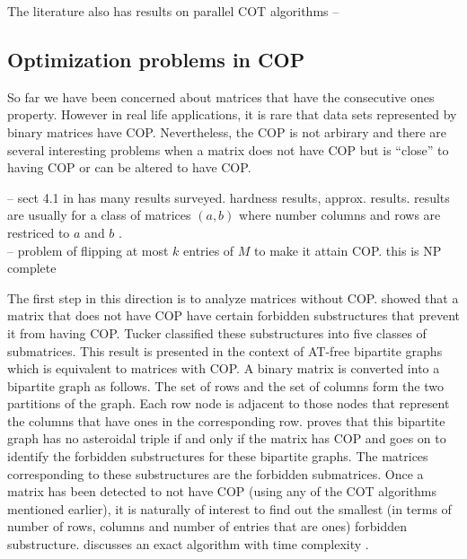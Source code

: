 \documentclass[MS,synopsis]{iitmdiss}
\begin{document}
The literature also has results on parallel COT algorithms --
\cite{as95} \cite{bs03} \cite{ly91}

\subsection{Optimization problems in COP}
So far we have been concerned about matrices that have the consecutive
ones property. However in real life applications, it is rare that data
sets represented by binary matrices have COP. Nevertheless, the COP is
not arbirary and there are several interesting problems when a matrix
does not have COP but is ``close'' to having COP or can be altered to
have COP.

-- sect 4.1 in \cite{d08phd} has many results surveyed. hardness
results, approx. results. results are usually for a class of matrices
$(a,b)$ where number columns and rows are restriced to $a$ and $b$
.\\
-- problem of flipping at most $k$ entries of $M$ to make it attain
COP. this is NP complete \cite{b75-phd}

The first step in this direction is to analyze matrices without
COP. \cite{at72} showed that a matrix that does not have COP have
certain forbidden substructures that prevent it from having
COP. Tucker classified these substructures into five classes of
submatrices. This result is presented in the context of AT-free
bipartite graphs  which is
equivalent to matrices with COP. A binary matrix is converted into a
bipartite graph as follows. The set of rows and the set of columns
form the two partitions of the graph. Each row node is adjacent to
those nodes that represent the columns that have ones in the
corresponding row. \cite{at72} proves that this bipartite graph has no
asteroidal triple if and only if the matrix has COP and goes on to
identify the forbidden substructures for these bipartite graphs. The
matrices corresponding to these substructures are the forbidden
submatrices. Once a matrix has been detected to not have COP (using
any of the COT algorithms mentioned earlier), it is naturally of
interest to find out the smallest (in terms of number of rows, columns
and number of entries that are ones) forbidden
substructure. \cite{d08phd} discusses an exact algorithm with time
complexity .
\end{document}
